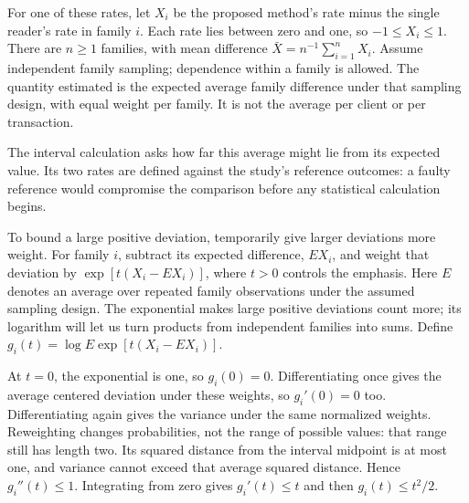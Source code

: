 For one of these rates, let $X_i$ be the proposed method's rate minus the single
reader's rate in family $i$. Each rate lies between zero and one, so
$-1\leq X_i\leq1$. There are $n\geq1$ families, with mean difference
$\bar X=n^{-1}\sum_{i=1}^{n}X_i$. Assume independent family sampling; dependence
within a family is allowed. The quantity estimated is the expected average
family difference under that sampling design, with equal weight per family.
It is not the average per client or per transaction.

The interval calculation asks how far this average might lie from its expected
value. Its two rates are defined against the study's reference outcomes: a
faulty reference would compromise the comparison before any statistical
calculation begins.

To bound a large positive deviation, temporarily give larger deviations more
weight. For family $i$, subtract its expected difference, $E X_i$, and weight
that deviation by $\exp[t(X_i-E X_i)]$, where $t>0$ controls the emphasis.
Here $E$ denotes an average over repeated family observations under the assumed
sampling design. The exponential makes large positive deviations count more;
its logarithm will let us turn products from independent families into sums.
Define $g_i(t)=\log E\exp[t(X_i-E X_i)]$.

At $t=0$, the exponential is one, so $g_i(0)=0$. Differentiating once gives the
average centered deviation under these weights, so $g_i'(0)=0$ too.
Differentiating again gives the variance under the same normalized weights.
Reweighting changes probabilities, not the range of possible values: that range
still has length two. Its squared distance from the interval midpoint is at
most one, and variance cannot exceed that average squared distance. Hence
$g_i''(t)\leq1$. Integrating from zero gives $g_i'(t)\leq t$ and then
$g_i(t)\leq t^2/2$.

